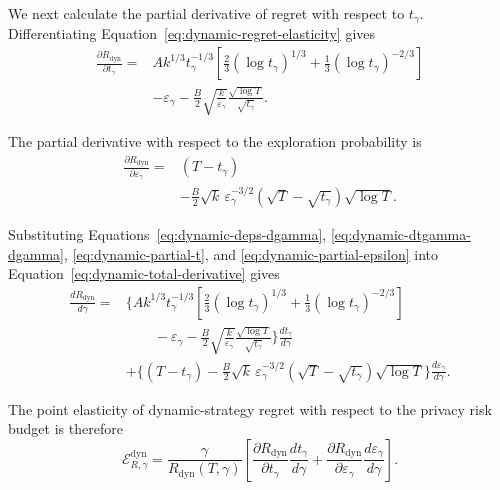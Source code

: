 \documentclass[mksc,nonblindrev]{informs3}
\begin{document}
\begin{APPENDICES}
We next calculate the partial derivative of regret with respect to \(t_\gamma\). Differentiating Equation~\eqref{eq:dynamic-regret-elasticity}
gives
\begin{equation}
\label{eq:dynamic-partial-t}
\begin{aligned}
\frac{\partial R_{\mathrm{dyn}}}{\partial t_\gamma}
={}&
A k^{1/3}t_\gamma^{-1/3}
\left[
\frac{2}{3}(\log t_\gamma)^{1/3}
+
\frac{1}{3}(\log t_\gamma)^{-2/3}
\right]
\\
&-
\varepsilon_\gamma
-
\frac{B}{2}
\sqrt{\frac{k}{\varepsilon_\gamma}}
\frac{\sqrt{\log T}}{\sqrt{t_\gamma}}.
\end{aligned}
\end{equation}

The partial derivative with respect to the exploration probability is
\begin{equation}
\label{eq:dynamic-partial-epsilon}
\begin{aligned}
\frac{\partial R_{\mathrm{dyn}}}
{\partial\varepsilon_\gamma}
={}&
(T-t_\gamma)
\\
&-
\frac{B}{2}
\sqrt{k}\,
\varepsilon_\gamma^{-3/2}
\left(\sqrt{T}-\sqrt{t_\gamma}\right)
\sqrt{\log T}.
\end{aligned}
\end{equation}

Substituting Equations~\eqref{eq:dynamic-deps-dgamma},
\eqref{eq:dynamic-dtgamma-dgamma},
\eqref{eq:dynamic-partial-t}, and
\eqref{eq:dynamic-partial-epsilon} into
Equation~\eqref{eq:dynamic-total-derivative} gives
\begin{equation}
\label{eq:dynamic-dR-dgamma}
\begin{aligned}
\frac{dR_{\mathrm{dyn}}}{d\gamma}
={}&
\Bigg\{
A k^{1/3}t_\gamma^{-1/3}
\left[
\frac{2}{3}(\log t_\gamma)^{1/3}
+
\frac{1}{3}(\log t_\gamma)^{-2/3}
\right]
\\
&\qquad
-
\varepsilon_\gamma
-
\frac{B}{2}
\sqrt{\frac{k}{\varepsilon_\gamma}}
\frac{\sqrt{\log T}}{\sqrt{t_\gamma}}
\Bigg\}
\frac{dt_\gamma}{d\gamma}
\\
&+
\Bigg\{
(T-t_\gamma)
-
\frac{B}{2}
\sqrt{k}\,
\varepsilon_\gamma^{-3/2}
\left(\sqrt{T}-\sqrt{t_\gamma}\right)
\sqrt{\log T}
\Bigg\}
\frac{d\varepsilon_\gamma}{d\gamma}.
\end{aligned}
\end{equation}

The point elasticity of dynamic-strategy regret with respect to the privacy risk budget is therefore
\begin{equation}
\label{eq:dynamic-elasticity-final}
\mathcal{E}^{\mathrm{dyn}}_{R,\gamma}
=
\frac{\gamma}{R_{\mathrm{dyn}}(T,\gamma)}
\left[
\frac{\partial R_{\mathrm{dyn}}}{\partial t_\gamma}
\frac{dt_\gamma}{d\gamma}
+
\frac{\partial R_{\mathrm{dyn}}}
{\partial\varepsilon_\gamma}
\frac{d\varepsilon_\gamma}{d\gamma}
\right].
\end{equation}


\end{APPENDICES}
\end{document}
